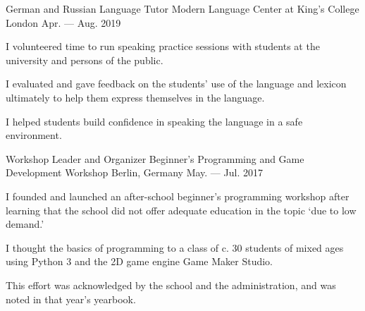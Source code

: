 \begin{cventries}
  \cventry
  {German and Russian Language Tutor} %
  {Modern Language Center at King’s College London} %
  {} %
  {Apr. --- Aug. 2019} %
  {
     \begin{cvitems} %
    \item {I volunteered time to run speaking practice sessions with students at the university and persons of the public.}
    \item {I evaluated and gave feedback on the students' use of the language and lexicon ultimately to help them express themselves in the language.}
    \item {I helped students build confidence in speaking the language in a safe environment.}
    \end{cvitems}
 }

  \cventry
  {Workshop Leader and Organizer} %
  {Beginner's Programming and Game Development Workshop} %
  {Berlin, Germany} %
  {May. --- Jul. 2017} %
  {
    \begin{cvitems} %
      \item I founded and launched an after-school beginner’s programming workshop after learning that the school did not offer adequate education in the topic `due to low demand.'
      \item I thought the basics of programming to a class of c. 30 students of mixed ages using Python 3 and the 2D game engine Game Maker Studio.
      \item This effort was acknowledged by the school and the administration, and was noted in that year's yearbook.
    \end{cvitems}
  }

\end{cventries}
